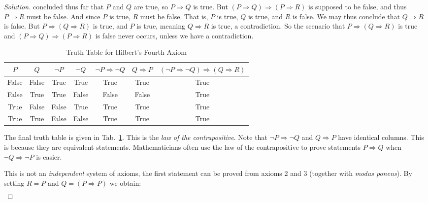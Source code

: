 \documentclass{article}
\theoremstyle{normal}
\begin{document}
\begin{proof}[Solution]
        concluded thus far that $P$ and $Q$ are true, so $P\Rightarrow{Q}$ is
        true. But $(P\Rightarrow{Q})\Rightarrow(P\Rightarrow{R})$ is supposed
        to be false, and thus $P\Rightarrow{R}$ must be false. And since $P$ is
        true, $R$ must be false. That is, $P$ is true, $Q$ is true, and $R$ is
        false. We may thus conclude that $Q\Rightarrow{R}$ is false. But
        $P\Rightarrow(Q\Rightarrow{R})$ is true, and $P$ is true, meaning
        $Q\Rightarrow{R}$ is true, a contradiction. So the scenario that
        $P\Rightarrow(Q\Rightarrow{R})$ is true and
        $(P\Rightarrow{Q})\Rightarrow(P\Rightarrow{R})$ is false never occurs,
        unless we have a contradiction.
        \par\hfill\par
        \begin{table}
            \centering
            \begin{tabular}{c | c | c | c | c | c | c}
                $P$&$Q$&$\neg{P}$&$\neg{Q}$&
                $\neg{P}\Rightarrow\neg{Q}$&
                $Q\Rightarrow{P}$&
                $(\neg{P}\Rightarrow\neg{Q})\Rightarrow(Q\Rightarrow{R})$\\
                \hline
                False&False&True&True&True&True&True\\
                False&True&True&False&False&False&True\\
                True&False&False&True&True&True&True\\
                True&True&False&False&True&True&True
            \end{tabular}
            \caption{Truth Table for Hilbert's Fourth Axiom}
            \label{tab:hilberts_fourth}
        \end{table}
        The final truth table is given in Tab.~\ref{tab:hilberts_fourth}. This
        is the \textit{law of the contrapositive}. Note that
        $\neg{P}\Rightarrow\neg{Q}$ and $Q\Rightarrow{P}$ have identical
        columns. This is because they are equivalent statements. Mathematicians
        often use the law of the contrapositive to prove statements
        $P\Rightarrow{Q}$ when $\neg{Q}\Rightarrow\neg{P}$ is easier.
        \par\hfill\par
        This is not an \textit{independent} system of axioms, the first
        statement can be proved from axioms 2 and 3 (together with
        \textit{modus ponens}). By setting $R=P$ and $Q=(P\Rightarrow{P})$
        we obtain:
        \begin{align}

\end{align}
\end{proof}
\end{document}
